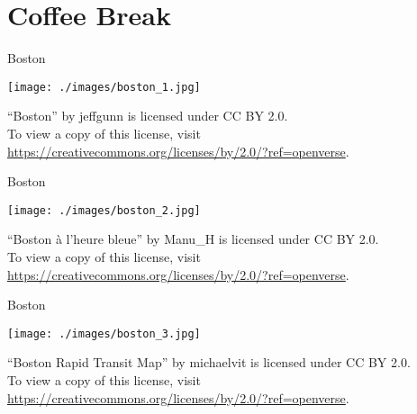 \documentclass[aspectratio=169,xcolor={dvipsnames,table}]{beamer}
\begin{document}
\section*{Coffee Break}
\begin{frame}[plain]{Boston}

\raggedleft

\texttt{[image: ./images/boston\_1.jpg]}

\vspace*{-8pt}
\tiny

``Boston'' by jeffgunn is licensed under CC BY 2.0. \\
To view a copy of this license, visit \url{https://creativecommons.org/licenses/by/2.0/?ref=openverse}.
  \end{frame}
\begin{frame}[plain]{Boston}

\raggedleft

\texttt{[image: ./images/boston\_2.jpg]}

\vspace*{-8pt}
\tiny


``Boston \`{a} l'heure bleue'' by Manu\_H is licensed under CC BY 2.0.\\
To view a copy of this license, visit \url{https://creativecommons.org/licenses/by/2.0/?ref=openverse}.

 \end{frame}
\begin{frame}[plain]{Boston}

\raggedleft

\texttt{[image: ./images/boston\_3.jpg]}

\vspace*{-8pt}
\tiny

``Boston Rapid Transit Map'' by michaelvit is licensed under CC BY 2.0.\\
 To view a copy of this license, visit \url{https://creativecommons.org/licenses/by/2.0/?ref=openverse}.
 \end{frame}
\end{document}
